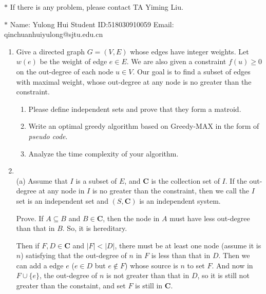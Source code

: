 \documentclass[12pt,a4paper]{article}
\makeatletter
\newtheorem*{solution}{Solution}
\theoremstyle{definition}
\renewenvironment{solution}[1][Solution] {\par\pushQED{\qed}\normalfont\topsep6\p@\@plus6\p@\relax\trivlist\item[\hskip\labelsep\bfseries#1\@addpunct{.}]\ignorespaces}{\popQED\endtrivlist\@endpefalse} \makeatother
\makeatother
\begin{document}
\noindent

\noindent{}
\begin{center}
\footnotesize{\color{red}$*$ If there is any problem, please contact TA Yiming Liu.}

\footnotesize{\color{blue}$*$ Name: Yulong Hui  \quad Student ID:518030910059  \quad Email: qinchuanhuiyulong@sjtu.edu.cn}
\end{center}

\begin{enumerate}
\item Give a directed graph $G=(V,E)$ whose edges have integer weights. Let $w(e)$ be the weight of edge $e\in E$. We are also given a constraint $f(u)\geq 0$ on the out-degree of each node $u\in V$. Our goal is to find a subset of edges with maximal weight, whose out-degree at any node is no greater than the constraint.
	\begin{enumerate}
	    \item Please define independent sets and prove that they form a matroid.
	    \item Write an optimal greedy algorithm based on Greedy-MAX in the form of \emph{pseudo code}.
	    \item Analyze the time complexity of your algorithm.
	\end{enumerate}

\begin{solution}
	~\\
	(a) Assume that $ I$ is a subset of $E$, and  \textbf{C} is the collection set of $I$. If the out-degree at any node in $I$ is no greater than the constraint, then we call the $I$ set is an independent set and  $(S,\textbf{C})$ is an independent system.
	
	Prove. If $A\subseteq B$ and $B\in \textbf{C}$, then the node in $A$ must have less out-degree than that in $B$. So, it is hereditary.
	
	Then if $F,D \in \textbf{C}$ and $|F|<|D|$, there must be at least one node (assume it is $n$) satisfying that the out-degree of $n$ in $F$ is less than that in $D$. Then we can add a edge $e$ ($e\in D$ but $e\notin F$) whose source is $n$ to set $F$. And now in $F\cup \{ e\}$, the out-degree of $n$ is not greater than that in $D$, so it is still not greater than the constaint, and set $F$ is still in \textbf{C}. 
	

\end{solution}
\end{enumerate}
\end{document}
